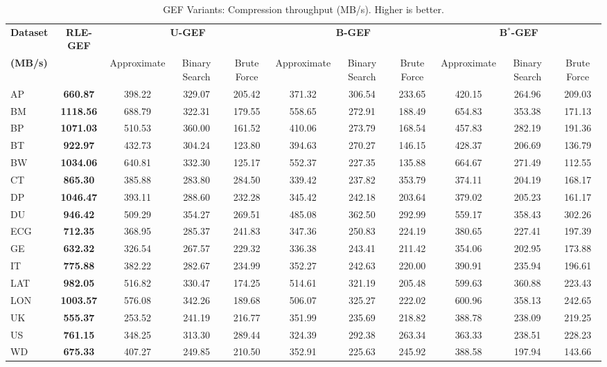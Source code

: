 \begin{table*}[htbp]
\caption{GEF Variants: Compression throughput (MB/s). Higher is better.}
\label{tab:gef_comp_throughput}
\centering
\small
\setlength{\tabcolsep}{4pt} %
\begin{tabular}{lcccccccccc}
\toprule
\textbf{Dataset} & \textbf{RLE-GEF} & \multicolumn{3}{c}{\textbf{U-GEF}} & \multicolumn{3}{c}{\textbf{B-GEF}} & \multicolumn{3}{c}{\textbf{B$^*$-GEF}} \\
\textbf{(MB/s)} &   & Approximate & Binary Search & Brute Force & Approximate & Binary Search & Brute Force & Approximate & Binary Search & Brute Force \\
\cmidrule(lr){3-5} \cmidrule(lr){6-8} \cmidrule(lr){9-11} 
\midrule
AP & \textbf{660.87} & 398.22 & 329.07 & 205.42 & 371.32 & 306.54 & 233.65 & 420.15 & 264.96 & 209.03 \\
BM & \textbf{1118.56} & 688.79 & 322.31 & 179.55 & 558.65 & 272.91 & 188.49 & 654.83 & 353.38 & 171.13 \\
BP & \textbf{1071.03} & 510.53 & 360.00 & 161.52 & 410.06 & 273.79 & 168.54 & 457.83 & 282.19 & 191.36 \\
BT & \textbf{922.97} & 432.73 & 304.24 & 123.80 & 394.63 & 270.27 & 146.15 & 428.37 & 206.69 & 136.79 \\
BW & \textbf{1034.06} & 640.81 & 332.30 & 125.17 & 552.37 & 227.35 & 135.88 & 664.67 & 271.49 & 112.55 \\
CT & \textbf{865.30} & 385.88 & 283.80 & 284.50 & 339.42 & 237.82 & 353.79 & 374.11 & 204.19 & 168.17 \\
DP & \textbf{1046.47} & 393.11 & 288.60 & 232.28 & 345.42 & 242.18 & 203.64 & 379.02 & 205.23 & 161.17 \\
DU & \textbf{946.42} & 509.29 & 354.27 & 269.51 & 485.08 & 362.50 & 292.99 & 559.17 & 358.43 & 302.26 \\
ECG & \textbf{712.35} & 368.95 & 285.37 & 241.83 & 347.36 & 250.83 & 224.19 & 380.65 & 227.41 & 197.39 \\
GE & \textbf{632.32} & 326.54 & 267.57 & 229.32 & 336.38 & 243.41 & 211.42 & 354.06 & 202.95 & 173.88 \\
IT & \textbf{775.88} & 382.22 & 282.67 & 234.99 & 352.27 & 242.63 & 220.00 & 390.91 & 235.94 & 196.61 \\
LAT & \textbf{982.05} & 516.82 & 330.47 & 174.25 & 514.61 & 321.19 & 205.48 & 599.63 & 360.88 & 223.43 \\
LON & \textbf{1003.57} & 576.08 & 342.26 & 189.68 & 506.07 & 325.27 & 222.02 & 600.96 & 358.13 & 242.65 \\
UK & \textbf{555.37} & 253.52 & 241.19 & 216.77 & 351.99 & 235.69 & 218.82 & 388.78 & 238.09 & 219.25 \\
US & \textbf{761.15} & 348.25 & 313.30 & 289.44 & 324.39 & 292.38 & 263.34 & 363.33 & 238.51 & 228.23 \\
WD & \textbf{675.33} & 407.27 & 249.85 & 210.50 & 352.91 & 225.63 & 245.92 & 388.58 & 197.94 & 143.66 \\
\bottomrule
\end{tabular}
\end{table*}
